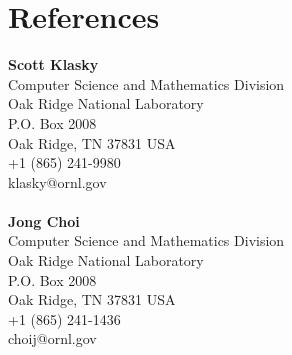 \documentclass[12pt,a4paper,sans]{moderncv}	%
\begin{document}





\section{References}
\begin{minipage}{0.48\textwidth}
\textbf{Scott Klasky} \\
Computer Science and Mathematics Division \\
Oak Ridge National Laboratory \\
P.O. Box 2008 \\
Oak Ridge, TN 37831 USA \\
+1 (865) 241-9980 \\
klasky@ornl.gov \\
\\
\textbf{Jong Choi} \\
Computer Science and Mathematics Division \\
Oak Ridge National Laboratory \\
P.O. Box 2008 \\
Oak Ridge, TN 37831 USA \\
+1 (865) 241-1436 \\
choij@ornl.gov \\
\end{minipage}%
\end{document}
